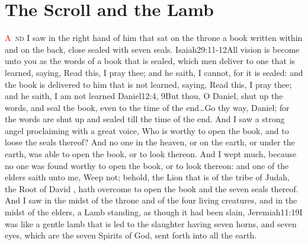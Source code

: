\chapter{The Scroll and the Lamb}
\lettrine[lines=3,slope=0.5em]{\textcolor{red}{A}}{\ nd} I saw in the right hand of him that sat on the throne a book written within and on the back, close sealed with seven seals.%
 					{Isaiah}{29:11-12}{All vision is become unto you as the words of a book that is sealed, which men deliver to one that is learned, saying, Read this, I pray thee; and he saith, I cannot, for it is sealed: and the book is delivered to him that is not learned, saying, Read this, I pray thee; and he saith, I am not learned}%
 					{Daniel}{12:4, 9}{But thou, O Daniel, shut up the words, and seal the book, even to the time of the end\ldots Go thy way, Daniel; for the words are shut up and sealed till the time of the end.} %
 And I saw a strong angel proclaiming with a great voice, Who is worthy to open the book, and to loose the seals thereof? %
 And no one in the heaven, or on the earth, or under the earth, was able to open the book, or to look thereon. %
 And I wept much, because no one was found worthy to open the book, or to look thereon: %
 and one of the elders saith unto me, Weep not; behold, the Lion that is of the tribe of Judah,%
 the Root of David%
 , hath overcome to open the book and the seven seals thereof. %
 And I saw in the midst of the throne and of the four living creatures, and in the midst of the elders, a Lamb standing, as though it had been slain,%
					  {Jeremiah}{11:19}{I was like a gentle lamb that is led to the slaughter}
 having seven horns, and seven eyes, which are the seven Spirits of God, sent forth into all the earth.%
